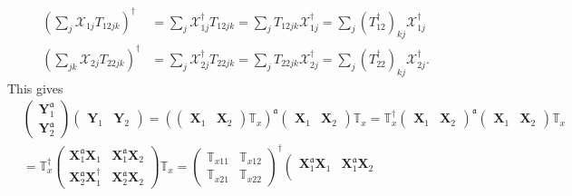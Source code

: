 \documentclass[aps, preprint]{revtex4}
\begin{document}
\begin{align}\left (\sum _{j}\mathcal{X}_{1 j} T_{1 2 j k}\right )^{ \dag } &  =\sum _{j}\mathcal{X}_{1 j}^{ \dag } T_{1 2 j k} =\sum _{j}T_{1 2 j k} \mathcal{X}_{1 j}^{ \dag } =\sum _{j}\left (T_{1 2}^{ \dag }\right )_{k j} \mathcal{X}_{1 j}^{ \dag } \\
\left (\sum _{j k}\mathcal{X}_{2 j} T_{2 2 j k}\right )^{ \dag } &  =\sum _{j}\mathcal{X}_{2 j}^{ \dag } T_{2 2 j k} =\sum _{j}T_{2 2 j k} \mathcal{X}_{2 j}^{ \dag } =\sum _{j}\left (T_{2 2}^{ \dag }\right )_{k j} \mathcal{X}_{2 j}^{ \dag }\text{.}\end{align}This gives
\begin{align} & \left (\begin{array}{c}\mathbf{Y}_{1}^{\mathfrak{a}} \\
\mathbf{Y}_{2}^{\mathfrak{a}}\end{array}\right ) \left (\begin{array}{cc}\mathbf{Y}_{1} & \mathbf{Y}_{2}\end{array}\right ) =\left (\left (\begin{array}{cc}\mathbf{X}_{1} & \mathbf{X}_{2}\end{array}\right ) \mathbb{T}_{x}\right )^{\mathfrak{a}} \left (\begin{array}{cc}\mathbf{X}_{1} & \mathbf{X}_{2}\end{array}\right ) \mathbb{T}_{x} =\mathbb{T}_{x}^{ \dag } \left (\begin{array}{cc}\mathbf{X}_{1} & \mathbf{X}_{2}\end{array}\right )^{\mathfrak{a}} \left (\begin{array}{cc}\mathbf{X}_{1} & \mathbf{X}_{2}\end{array}\right ) \mathbb{T}_{x} \nonumber  \\
 &  =\mathbb{T}_{x}^{ \dag } \left (\begin{array}{cc}\mathbf{X}_{1}^{\mathfrak{a}} \mathbf{X}_{1} & \mathbf{X}_{1}^{\mathfrak{a}} \mathbf{X}_{2} \\
\mathbf{X}_{2}^{\mathfrak{a}} \mathbf{X}_{1}^{ \dag } & \mathbf{X}_{2}^{\mathfrak{a}} \mathbf{X}_{2}\end{array}\right ) \mathbb{T}_{x} =\left (\begin{array}{cc}\mathbb{T}_{x 1 1} & \mathbb{T}_{x 1 2} \\
\mathbb{T}_{x 2 1} & \mathbb{T}_{x 2 2}\end{array}\right )^{ \dag } \left (\begin{array}{cc}\mathbf{X}_{1}^{\mathfrak{a}} \mathbf{X}_{1} & \mathbf{X}_{1}^{\mathfrak{a}} \mathbf{X}_{2} \\

\end{array}
\end{align}
\end{document}

